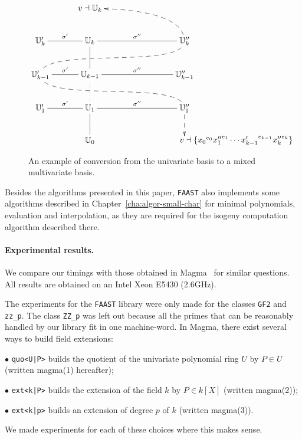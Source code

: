 \begin{figure}
  \centering
  \begin{equation*}
    \xymatrix@C=1cm{
      & v\wrt\U_k \ar@{<--}@(r,u)[dr] \\
      \U_k'\ar@{-}[r]^{\sigma'} & \U_k\ar@{-}[d] & \U_k''\ar@{-}[l]_{\sigma''} \ar@{--}@(d,u)[dll]\\
      \U_{k-1}'\ar@{-}[r]^{\sigma'} \ar@{--}@(d,u)[drr] & \U_{k-1}\ar@{.}[d] & \U_{k-1}''\ar@{-}[l]_{\sigma''}\\
      \U_1'\ar@{-}[r]^{\sigma'} & \U_1\ar@{-}[d] & \U_1''\ar@{-}[l]_{\sigma''}\ar@{-->}[d]\\
      & \U_0 & *[r]{v\wrt\{{x_0}^{e_0}{x_1''}^{e_1}\cdots {x_{k-1}'}^{e_{k-1}}{x_k''}^{e_k}\}}
    }
  \end{equation*}
  \caption{An example of conversion from the univariate basis to a
    mixed multivariate basis.}
  \label{fig:lattice}
\end{figure}

Besides the algorithms presented in this paper, \texttt{FAAST} also
implements some algorithms described in
Chapter~\ref{cha:algor-small-char} for minimal polynomials, evaluation
and interpolation, as they are required for the isogeny computation
algorithm described there.

\paragraph{Experimental results.} We compare our timings with
those obtained in Mag\-ma~\cite{MAGMA} for similar questions.  All
results are obtained on an Intel Xeon E5430 (2.6GHz).


The experiments for the \texttt{FAAST} library were only made for the
classes \texttt{GF2} and \texttt{zz\_p}. The class \texttt{ZZ\_p} was
left out because all the primes that can be reasonably handled by our
library fit in one machine-word. In Magma, there exist several ways to
build field extensions:
\begin{description*}
\item [$\bullet$ {\tt quo<U|P>}] builds the quotient of the
  univariate polynomial ring $U$ by  $P \in U$
  (written magma(1) hereafter);
\item [$\bullet$ {\tt ext<k|P>}] builds the extension of the field $k$ by $P \in
  k[X]$ (written magma(2));
\item [$\bullet$ {\tt ext<k|p>}] builds an extension of degree $p$ of $k$
  (written magma(3)).
\end{description*}
We made experiments for each of these choices where this makes sense.

